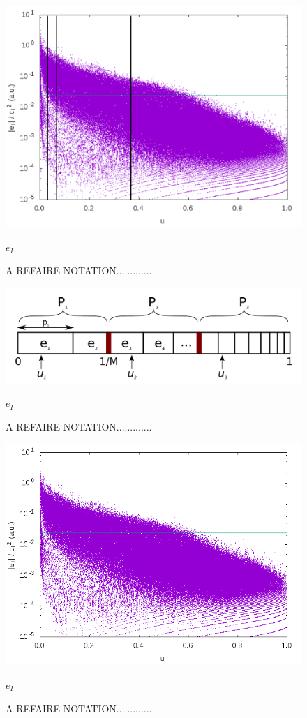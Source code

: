 \documentclass[./thesis.tex]{subfiles}
\begin{document}
\begin{figure}[h!]
	\begin{center}
		\includegraphics[width=0.9\columnwidth]{figures/pt2/eici2comb}
		\caption{A REFAIRE NOTATION.............}
		\label{fig:eici2comb}
		$e_I$
	\end{center}
\end{figure}

\begin{figure}[h!]
	\begin{center}
		\includegraphics[width=0.9\columnwidth]{figures/pt2/comb}
		\caption{A REFAIRE NOTATION.............}
		\label{fig:comb}
		$e_I$
	\end{center}
\end{figure}


\begin{figure}[h!]
	\begin{center}
		\includegraphics[width=0.9\columnwidth]{figures/pt2/eici2}
		\caption{A REFAIRE NOTATION.............}
		\label{fig:eici2}
		$e_I$
	\end{center}
\end{figure}
\end{document}
